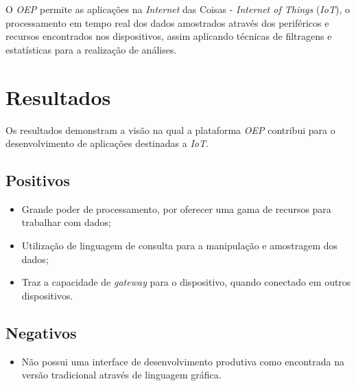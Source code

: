 O \textit{OEP} permite as aplicações na \textit{Internet} das Coisas -
\textit{Internet of Things} (\textit{IoT}), o processamento em tempo real 
dos dados amostrados através dos periféricos e recursos encontrados nos 
dispositivos, assim aplicando técnicas de filtragens e estatísticas para a 
realização de análises.

\section{Resultados}

Os resultados demonstram a visão na qual a plataforma \textit{OEP} contribui 
para o desenvolvimento de aplicações destinadas a 
\textit{IoT}.

\subsection{Positivos}

\begin{itemize}
    
    \item Grande poder de processamento, por oferecer uma gama de recursos para 
    trabalhar com dados;
    
    \item Utilização de linguagem de consulta para a manipulação e amostragem 
    dos dados;
    
    \item Traz a capacidade de \textit{gateway} para o dispositivo, quando 
    conectado em outros dispositivos.
    
\end{itemize}

\subsection{Negativos}

\begin{itemize}
    
    \item Não possui uma interface de desenvolvimento produtiva como 
    encontrada na versão tradicional através de linguagem gráfica.
    
\end{itemize}
